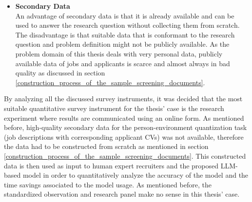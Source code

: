 \documentclass[draft,final]{thesisclass} %
\begin{document}
\begin{itemize}
    \item \textbf{Secondary Data}\\
    An advantage of secondary data is that it is already available and can be used to answer the research question without collecting them from scratch.
    The disadvantage is that suitable data that is conformant to the research question and problem definition might not be publicly available.
    As the problem domain of this thesis deals with very personal data, publicly available data of jobs and applicants is scarce and almost always in bad quality as discussed in section \ref{construction_process_of_the_sample_screening_documents}.
\end{itemize}
By analyzing all the discussed survey instruments, it was decided that the most suitable quantitative survey instrument for the thesis' case is the research experiment where results are communicated using an online form.
As mentioned before, high-quality secondary data for the person-environment quantization task (job descriptions with corresponding applicant \acs{CV}s) was not available, therefore the data had to be constructed from scratch as mentioned in section \ref{construction_process_of_the_sample_screening_documents}.
This constructed data is then used as input to human expert recruiters and the proposed \acs{LLM}-based model in order to quantitatively analyze the accuracy of the model and the time savings associated to the model usage.
As mentioned before, the standardized observation and research panel make no sense in this thesis' case.
\end{document}
